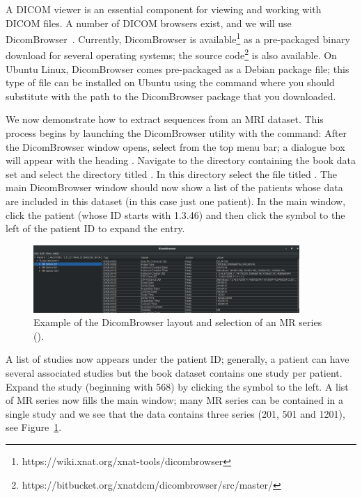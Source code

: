 A DICOM viewer is an essential component for viewing and working with
DICOM files. A number of DICOM browsers exist, and we will use
DicomBrowser~\cite{dicombrowser}.  Currently, DicomBrowser is
available\footnote{https://wiki.xnat.org/xnat-tools/dicombrowser} as a
pre-packaged binary download for several operating systems; the source
code\footnote{https://bitbucket.org/xnatdcm/dicombrowser/src/master/}
is also available. On Ubuntu Linux, DicomBrowser comes pre-packaged
as a Debian package file; this type of file can be installed on
Ubuntu using the command 
\noindent where you should substitute  with
the path to the DicomBrowser package that you downloaded.

We now demonstrate how to extract sequences from an MRI dataset. This
process begins by launching the DicomBrowser utility with the 
command: 
\noindent After the DicomBrowser window opens, select
 from the top menu bar; a dialogue box
will appear with the heading . Navigate to
the directory containing the book data set and select the directory
titled \emp{\erniedicom}.  In this directory select the file titled
. The main DicomBrowser window should now show a list of
the patients whose data are included in this dataset (in this case
just one patient).  In the main window, click the patient
(whose ID starts with 1.3.46) and then click the symbol to the left of
the patient ID to expand the entry.

\begin{figure}[h]
  \centering
  \includegraphics[width=0.9\textwidth]{./graphics/chp2/dicombrowser-d}
  \caption{Example of the DicomBrowser layout and selection of an MR series (\emp{\erniedicom}).} 
  \label{fig:chp2:dicombrwsr-scr}
\end{figure}

A list of studies now appears under the patient ID; generally, a
patient can have several associated studies but the book dataset
contains one study per patient. Expand the study (beginning with 568)
by clicking the symbol to the left. A list of MR series now fills the
main window; many MR series can be contained in a single study and we
see that the \emp{\erniedicom} data contains three series (201, 501 and 1201), see 
Figure~\ref{fig:chp2:dicombrwsr-scr}.

